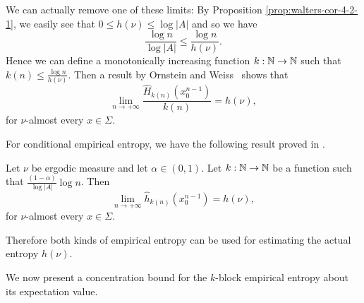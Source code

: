 We can actually remove one of these limits: By Proposition \ref{prop:walters-cor-4-2-1}, we easily see that $0 \leq h(\nu) \leq \log{|A|}$ and so we have
\[
	\frac{\log{n}}{\log{|A|}} \leq \frac{\log{n}}{h(\nu)}.
\]
Hence we can define a monotonically increasing function $k : \mathbb{N} \to \mathbb{N}$ such that $k(n) \leq \frac{\log{n}}{h(\nu)}$. Then a result by Ornstein and Weiss~\cite{shields:ergodic} shows that
\[
	\lim_{n \to +\infty}{\frac{\hat{H}_{k(n)}(x_0^{n -1})}{k(n)}} = h(\nu),
\]
for $\nu$-almost every $x \in \Sigma$.

For conditional empirical entropy, we have the following result proved in \cite[Theorem II.3.5]{shields:ergodic}.

\begin{theorem} \label{thm:entropy-estimation}
	 Let $\nu$ be ergodic measure and let $\alpha \in (0, 1)$. Let $k : \mathbb{N} \to \mathbb{N}$ be a function such that $\frac{(1 - \alpha)}{\log{|A|}}\log{n}$. Then
	 \[
	 	\lim_{n \to +\infty}{\hat{h}_{k(n)}(x_0^{n - 1})} = h(\nu),
	 \]
	 for $\nu$-almost every $x \in \Sigma$.
\end{theorem}

Therefore both kinds of empirical entropy can be used for estimating the actual entropy $h(\nu)$.

We now present a concentration bound for the $k$-block empirical entropy about its expectation value.

